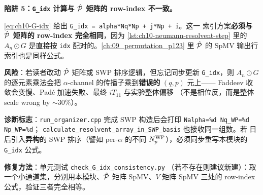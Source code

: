 \begin{pitfallbox}[label=box:ch10-pitfall-G-idx]
\textbf{陷阱 5：\texttt{G\_idx} 计算与 \(\hat{\mathcal{P}}\) 矩阵的 row-index 不一致。}

\cref{eq:ch10-G-idx} 给出 \texttt{G\_idx = alpha*Nq*Np + j*Np + i}。这一
索引方案\textbf{必须与 \(\hat{\mathcal{P}}\) 矩阵的 row-index 完全相同}，因为
\cref{lst:ch10-neumann-resolvent-step} 里的 \(A_n \odot G\) 是直接按
\texttt{idx} 配对的。\cref{ch:09_permutation_p123} 里 \(\hat{\mathcal{P}}\) 的
SpMV 输出行索引也是同样公式。

\textbf{风险}：若读者改动 \(\hat{\mathcal{P}}\) 矩阵或 SWP 排序逻辑，但忘记同步更新
\texttt{G\_idx}，则 \(A_n \odot G\) 的逐元素乘法会把
\(\alpha\)-channel 的传播子乘到\textbf{错误的} \((q, p)\) 元上——
Faddeev 收敛会变慢、Padé 加速失败、最终 \(iT_{11}\) 与实验整体偏移
（不是相位反，而是整体 scale wrong by \(\sim 30\%\)）。

\textbf{诊断标志}：\texttt{run\_organizer.cpp} 完成 SWP 构造后会打印
\texttt{Nalpha=\%d Nq\_WP=\%d Np\_WP=\%d}；
\texttt{calculate\_resolvent\_array\_in\_SWP\_basis} 也接收同一组数。若
日后引入\textbf{异构}的 SWP 排序（譬如 per-\(\alpha\) 的不同
\({N_{p}^{\text{WP}}}\)），必须同步重写本模块的 \texttt{G\_idx} 公式。

\textbf{修复方法}：单元测试 \texttt{check\_G\_idx\_consistency.py}
（若不存在则建议新建）：取一个小通道集，分别用本模块、\(\hat{\mathcal{P}}\) 矩阵
SpMV、\(V\) 矩阵 SpMV 三处的 row-index 公式，验证三者完全相等。
\end{pitfallbox}

